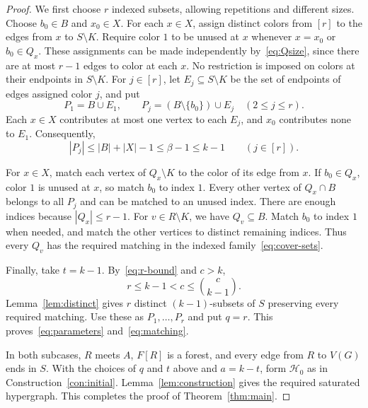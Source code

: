 \documentclass[10pt,a4paper]{article}
\numberwithin{equation}{section}
\theoremstyle{definition}
\theoremstyle{plain}
\newcommand{\HH}{\mathcal H}
\begin{document}
\begin{proof}
We first choose $r$ indexed subsets, allowing repetitions and different
sizes. Choose $b_0\in B$ and $x_0\in X$.
For each $x\in X$, assign distinct colors from $[r]$ to the edges
from $x$ to $S\setminus K$. Require color $1$ to be unused at $x$
whenever $x=x_0$ or $b_0\in Q_x$.
These assignments can be made independently by~\eqref{eq:Qsize},
since there are at most $r-1$ edges to color at each $x$.
No restriction is imposed on colors at their endpoints in $S\setminus K$.
For $j\in[r]$, let $E_j\subseteq S\setminus K$ be the set of
endpoints of edges assigned color $j$, and put
\begin{equation}\label{eq:cover-sets}
 P_1=B\cup E_1,\qquad
 P_j=(B\setminus\{b_0\})\cup E_j\quad(2\le j\le r).
\end{equation}
Each $x\in X$ contributes at most one vertex to each $E_j$, and $x_0$
contributes none to $E_1$. Consequently,
\begin{equation}\label{eq:cover-size}
 |P_j|\le |B|+|X|-1\le\beta-1\le k-1\qquad(j\in[r]).
\end{equation}

For $x\in X$, match each vertex of $Q_x\setminus K$ to the color
of its edge from $x$. If $b_0\in Q_x$, color $1$ is unused at $x$,
so match $b_0$ to index $1$. Every other vertex of $Q_x\cap B$
belongs to all $P_j$ and can be matched to an unused index.
There are enough indices because $|Q_x|\le r-1$.
For $v\in R\setminus K$, we have $Q_v\subseteq B$.
Match $b_0$ to index $1$ when needed, and match the other vertices
to distinct remaining indices. Thus every $Q_v$ has the required
matching in the indexed family~\eqref{eq:cover-sets}.

Finally, take $t=k-1$. By~\eqref{eq:r-bound} and $c>k$,
\[
 r\le k-1<c\le\binom c{k-1}.
\]
Lemma~\ref{lem:distinct} gives $r$ distinct $(k-1)$-subsets of $S$
preserving every required matching. Use these as $P_1,\ldots,P_r$
and put $q=r$. This proves~\eqref{eq:parameters} and~\eqref{eq:matching}.

In both subcases, $R$ meets $A$, $F[R]$ is a forest, and every edge
from $R$ to $V(G)$ ends in $S$. With the choices of $q$ and $t$
above and $a=k-t$, form $\HH_0$ as in Construction~\ref{con:initial}.
Lemma~\ref{lem:construction} gives the required saturated hypergraph.
This completes the proof of Theorem~\ref{thm:main}.
\end{proof}


\end{document}
